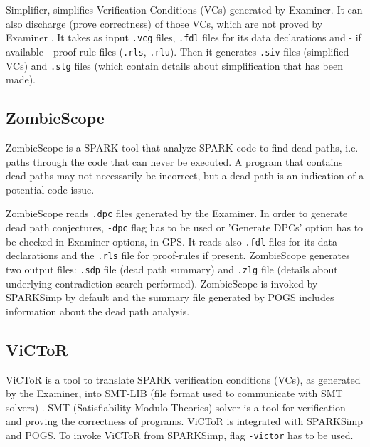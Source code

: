 Simplifier, simplifies Verification Conditions (VCs) generated by Examiner. It can also discharge (prove correctness) of those VCs, which are not proved by Examiner \cite{Simplifier:Online}. It takes as input \lstinline{.vcg} files, \lstinline{.fdl} files for its data declarations and - if available - proof-rule files (\lstinline{.rls}, \lstinline{.rlu}). Then it generates \lstinline{.siv} files (simplified VCs) and \lstinline{.slg} files (which contain details about simplification that has been made).



\subsection{ZombieScope}
\label{background:sparkverification:zombiescope}

ZombieScope is a SPARK tool that analyze SPARK code to find dead paths, i.e. paths through the code that can never be executed. A program that contains dead paths may not necessarily be incorrect, but a dead path is an indication of a potential code issue.

ZombieScope reads \lstinline{.dpc} files generated by the Examiner. In order to generate dead path conjectures, \lstinline{-dpc} flag has to be used or 'Generate DPCs' option has to be checked in Examiner options, in GPS. It reads also \lstinline{.fdl} files for its data declarations and the \lstinline{.rls} file for proof-rules if present. ZombieScope generates two output files: \lstinline{.sdp} file (dead path summary) and \lstinline{.zlg} file (details about underlying contradiction search performed). ZombieScope is invoked by SPARKSimp by default and the summary file generated by POGS includes information about the dead path analysis.



\subsection{ViCToR}
\label{background:sparkverification:victor}

ViCToR is a tool to translate SPARK verification conditions (VCs), as generated by the Examiner, into SMT-LIB (file format used to communicate with SMT solvers) \cite{Victor:Online}. SMT (Satisfiability Modulo Theories) solver is a tool for verification and proving the correctness of programs. ViCToR is integrated with SPARKSimp and POGS. To invoke ViCToR from SPARKSimp, flag \lstinline{-victor} has to be used.



